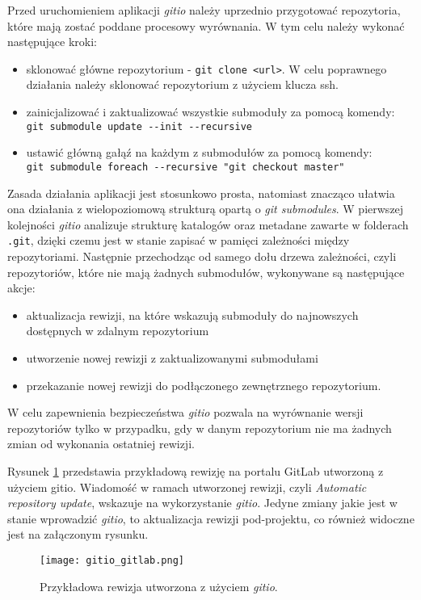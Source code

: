 Przed uruchomieniem aplikacji \emph{gitio} należy uprzednio przygotować repozytoria, które mają zostać poddane procesowy wyrównania. W tym celu należy wykonać następujące kroki:
\begin{itemize}
    \item sklonować główne repozytorium - \lstinline{git clone <url>}. W celu poprawnego działania należy sklonować repozytorium z użyciem klucza ssh.
    \item zainicjalizować i zaktualizować wszystkie submoduły za pomocą komendy: \\
        \lstinline{git submodule update --init --recursive}
    \item ustawić główną gałąź na każdym z submodułów za pomocą komendy: \\
        \lstinline{git submodule foreach --recursive "git checkout master"}
\end{itemize}
Zasada działania aplikacji jest stosunkowo prosta, natomiast znacząco ułatwia ona działania z wielopoziomową strukturą opartą o \emph{git submodules}. W pierwszej kolejności \emph{gitio} analizuje strukturę katalogów oraz metadane zawarte w folderach \lstinline{.git}, dzięki czemu jest w stanie zapisać w pamięci zależności między repozytoriami. Następnie przechodząc od samego dołu drzewa zależności, czyli repozytoriów, które nie mają żadnych submodułów, wykonywane są następujące akcje:
\begin{itemize}
    \item aktualizacja rewizji, na które wskazują submoduły do najnowszych dostępnych w zdalnym repozytorium
    \item utworzenie nowej rewizji z zaktualizowanymi submodułami
    \item przekazanie nowej rewizji do podłączonego zewnętrznego repozytorium.
\end{itemize}
W celu zapewnienia bezpieczeństwa \emph{gitio} pozwala na wyrównanie wersji repozytoriów tylko w przypadku, gdy w danym repozytorium nie ma żadnych zmian od wykonania ostatniej rewizji. 

Rysunek \ref{fig:gitlab_gitio} przedstawia przykładową rewizję na portalu GitLab utworzoną z użyciem gitio. Wiadomość w ramach utworzonej rewizji, czyli \emph{Automatic repository update}, wskazuje na wykorzystanie \emph{gitio}. Jedyne zmiany jakie jest w stanie wprowadzić \emph{gitio}, to aktualizacja rewizji pod-projektu, co również widoczne jest na załączonym rysunku.

\begin{figure}[H]
    \centering
    \texttt{[image: gitio\_gitlab.png]}
    \caption{Przykładowa rewizja utworzona z użyciem \emph{gitio}.}
    \label{fig:gitlab_gitio}
\end{figure}


